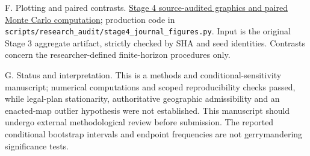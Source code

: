 \documentclass[
  10pt,
]{article}
\begin{document}
F. Plotting and paired contrasts.
\href{https://github.com/DjokovicMan22/Gerrymandering-Project/actions/runs/39203488689}{Stage
4 source-audited graphics and paired Monte Carlo computation};
production code in
\texttt{scripts/research\_audit/stage4\_journal\_figures.py}. Input is
the original Stage 3 aggregate artifact, strictly checked by SHA and
seed identities. Contrasts concern the researcher-defined finite-horizon
procedures only.

G. Status and interpretation. This is a methods and
conditional-sensitivity manuscript; numerical computations and scoped
reproducibility checks passed, while legal-plan stationarity,
authoritative geographic admissibility and an enacted-map outlier
hypothesis were not established. This manuscript should undergo external
methodological review before submission. The reported conditional
bootstrap intervals and endpoint frequencies are not gerrymandering
significance tests.
\end{document}
